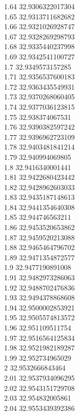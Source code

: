 {1.64	32.9306322017304\\
1.65	32.9313711682682\\
1.66	32.9321026928747\\
1.67	32.9328269298793\\
1.68	32.9335440237998\\
1.69	32.9342541100727\\
1.7	32.9349573157285\\
1.71	32.9356537600183\\
1.72	32.9363435549931\\
1.73	32.9370268060405\\
1.74	32.9377036123815\\
1.75	32.938374067531\\
1.76	32.9390382597242\\
1.77	32.9396962723109\\
1.78	32.9403481841214\\
1.79	32.940994069805\\
1.8	32.9416340001441\\
1.81	32.9422680423442\\
1.82	32.9428962603033\\
1.83	32.9435187148613\\
1.84	32.9441354640308\\
1.85	32.944746563211\\
1.86	32.9453520653862\\
1.87	32.9459520213088\\
1.88	32.9465464796702\\
1.89	32.9471354872577\\
1.9	32.9477190891008\\
1.91	32.9482973286063\\
1.92	32.9488702476836\\
1.93	32.9494378868608\\
1.94	32.9500002853921\\
1.95	32.9505574813572\\
1.96	32.951109511754\\
1.97	32.9516564125834\\
1.98	32.9521982189287\\
1.99	32.952734965029\\
2	32.9532666843464\\
2.01	32.9537934096295\\
2.02	32.9543151729708\\
2.03	32.954832005861\\
2.04	32.9553439392386\\
}
